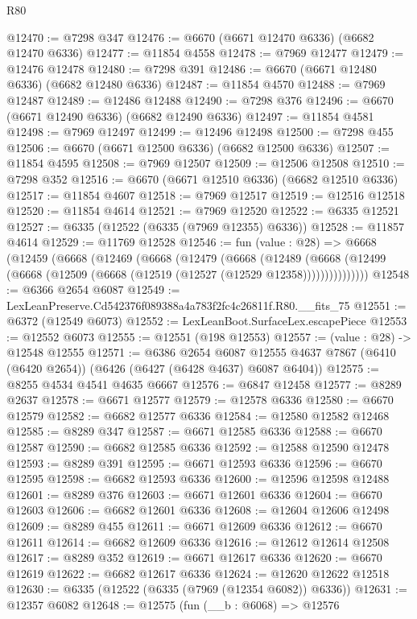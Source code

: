 \begin{lexlean}{R80}
\begin{coremodule}
@12470 := @7298 @347
@12476 := @6670 (@6671 @12470 @6336) (@6682 @12470 @6336)
@12477 := @11854 @4558
@12478 := @7969 @12477
@12479 := @12476 @12478
@12480 := @7298 @391
@12486 := @6670 (@6671 @12480 @6336) (@6682 @12480 @6336)
@12487 := @11854 @4570
@12488 := @7969 @12487
@12489 := @12486 @12488
@12490 := @7298 @376
@12496 := @6670 (@6671 @12490 @6336) (@6682 @12490 @6336)
@12497 := @11854 @4581
@12498 := @7969 @12497
@12499 := @12496 @12498
@12500 := @7298 @455
@12506 := @6670 (@6671 @12500 @6336) (@6682 @12500 @6336)
@12507 := @11854 @4595
@12508 := @7969 @12507
@12509 := @12506 @12508
@12510 := @7298 @352
@12516 := @6670 (@6671 @12510 @6336) (@6682 @12510 @6336)
@12517 := @11854 @4607
@12518 := @7969 @12517
@12519 := @12516 @12518
@12520 := @11854 @4614
@12521 := @7969 @12520
@12522 := @6335 @12521
@12527 := @6335 (@12522 (@6335 (@7969 @12355) @6336))
@12528 := @11857 @4614
@12529 := @11769 @12528
@12546 := fun (value : @28) =>
  @6668
    (@12459
      (@6668
        (@12469
          (@6668
            (@12479
              (@6668
                (@12489
                  (@6668 (@12499 (@6668 (@12509 (@6668 (@12519 (@12527 (@12529 @12358)))))))))))))))
@12548 := @6366 @2654 @6087
@12549 := LexLeanPreserve.Cd542376f089388a4a783f2fc4c26811f.R80.__fits_75
@12551 := @6372 (@12549 @6073)
@12552 := LexLeanBoot.SurfaceLex.escapePiece
@12553 := @12552 @6073
@12555 := @12551 (@198 @12553)
@12557 := (value : @28) -> @12548 @12555
@12571 := @6386
    @2654
    @6087
    @12555
    @4637
    @7867
    (@6410 (@6420 @2654))
    (@6426 (@6427 (@6428 @4637) @6087 @6404))
@12575 := @8255 @4534 @4541 @4635 @6667
@12576 := @6847 @12458
@12577 := @8289 @2637
@12578 := @6671 @12577
@12579 := @12578 @6336
@12580 := @6670 @12579
@12582 := @6682 @12577 @6336
@12584 := @12580 @12582 @12468
@12585 := @8289 @347
@12587 := @6671 @12585 @6336
@12588 := @6670 @12587
@12590 := @6682 @12585 @6336
@12592 := @12588 @12590 @12478
@12593 := @8289 @391
@12595 := @6671 @12593 @6336
@12596 := @6670 @12595
@12598 := @6682 @12593 @6336
@12600 := @12596 @12598 @12488
@12601 := @8289 @376
@12603 := @6671 @12601 @6336
@12604 := @6670 @12603
@12606 := @6682 @12601 @6336
@12608 := @12604 @12606 @12498
@12609 := @8289 @455
@12611 := @6671 @12609 @6336
@12612 := @6670 @12611
@12614 := @6682 @12609 @6336
@12616 := @12612 @12614 @12508
@12617 := @8289 @352
@12619 := @6671 @12617 @6336
@12620 := @6670 @12619
@12622 := @6682 @12617 @6336
@12624 := @12620 @12622 @12518
@12630 := @6335 (@12522 (@6335 (@7969 (@12354 @6082)) @6336))
@12631 := @12357 @6082
@12648 := @12575
    (fun (__b : @6068) =>
    @12576

\end{coremodule}
\end{lexlean}
